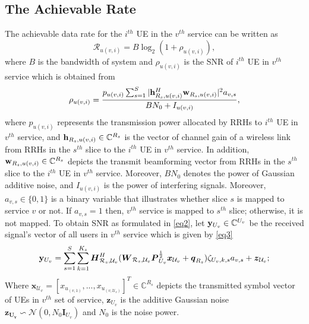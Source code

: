 \documentclass[conference]{IEEEtran}
\begin{document}
\subsection{The Achievable Rate}
The achievable data rate for the $i^{th}$ UE in the $v^{th}$ service can be written as 
\begin{equation}\label{eq1}
\mathcal{R}_{u(v,i)} = B \log_2({1+ \rho_{u(v,i)}}),
\end{equation}
where $B$ is the bandwidth of system and $\rho_{u(v,i)}$ is the SNR of $i^{th}$ UE in $v^{th}$ service which is obtained from 
\begin{equation}\label{eq2}
\rho_{u(v,i)} =  \frac{p_{u(v,i)}\sum_{s=1}^{S}|\bold{h}_{R_s,u(v,i)}^H \bold{w}_{R_s,u(v,i)}|^2 a_{v,s}}{BN_0 + I_{u(v,i)}},
\end{equation}
where $p_{u(v,i)}$ represents the transmission power allocated by RRHs to $i^{th}$ UE in $v^{th}$ service, and 
$\bold{h}_{R_s,u(v,i)} \in \mathbb{C}^{{R}_s}$ is the vector of channel gain of a wireless link from RRHs in the $s^{th}$ slice to the $i^{th}$ UE in $v^{th}$ service. In addition, $\bold{w}_{R_s,u(v,i)} \in \mathbb{C}^{{R}_s}$ depicts the  transmit beamforming vector from RRHs in the $s^{th}$ slice to the $i^{th}$ UE in $v^{th}$ service. Moreover, $BN_0$ denotes the power of Gaussian additive noise, and $I_{u(v,i)}$ is the power of interfering signals. Moreover, $a_{v,s} \in \{0,1\}$ is a binary variable that illustrates whether slice $s$ is mapped to service $v$ or not. If $a_{v,s} =1$ then, $v^{th}$ service is mapped to $s^{th}$ slice; otherwise, it is not mapped.
\newline 
To obtain SNR as formulated in \eqref{eq2}, let $\bold{y}_{U_v}\in \mathbb{C}^{U_v} $ be the received signal's vector of all users in $v^{th}$ service which is given by \eqref{eq3}
\begin{equation}\label{eq3}
\bold{y}_{U_v} = \sum_{s = 1}^{S}\sum_{k=1}^{K_s} \boldsymbol{H}^H_{\mathcal{R}_s,\mathcal{U}_v}(\boldsymbol{W}_{\mathcal{R}_s,\mathcal{U}_v}\boldsymbol{P}_{U_v}^{\frac{1}{2}}\boldsymbol{x}_{\mathcal{U}_v}+ \boldsymbol{q}_{R_s}) \zeta_{U_v,k,s} a_{v,s}+ \boldsymbol{z}_{\mathcal{U}_v};
\end{equation}
Where $\boldsymbol{x}_{ \mathcal{U}_v} = [x_{ u_{(v,1)}},...,x_{ u_{(v,\mathcal{U}_v)}}]^T \in \mathbb{C}^{{R}_s } $ depicts the transmitted symbol vector of UEs in $v^{th}$ set of service,  $\boldsymbol{z}_{U_v}$ is the additive Gaussian noise $\boldsymbol{z_{U_v}} \backsim \mathcal{N}(0,N_0\boldsymbol{I}_{{U}_v})$ and $N_0$ is the noise power.
\end{document}
